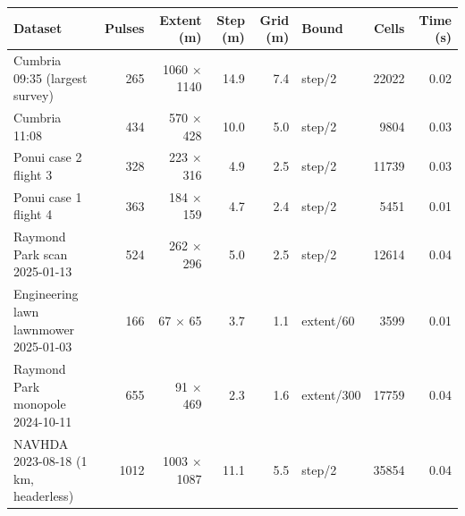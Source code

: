 \begin{tabular}{lrrrrlrr}
\toprule
Dataset & Pulses & Extent (m) & Step (m) & Grid (m) & Bound & Cells & Time (s) \\
\midrule
Cumbria 09:35 (largest survey) & 265 & 1060 $\times$ 1140 & 14.9 & 7.4 & step/2 & 22022 & 0.02 \\
Cumbria 11:08 & 434 & 570 $\times$ 428 & 10.0 & 5.0 & step/2 & 9804 & 0.03 \\
Ponui case 2 flight 3 & 328 & 223 $\times$ 316 & 4.9 & 2.5 & step/2 & 11739 & 0.03 \\
Ponui case 1 flight 4 & 363 & 184 $\times$ 159 & 4.7 & 2.4 & step/2 & 5451 & 0.01 \\
Raymond Park scan 2025-01-13 & 524 & 262 $\times$ 296 & 5.0 & 2.5 & step/2 & 12614 & 0.04 \\
Engineering lawn lawnmower 2025-01-03 & 166 & 67 $\times$ 65 & 3.7 & 1.1 & extent/60 & 3599 & 0.01 \\
Raymond Park monopole 2024-10-11 & 655 & 91 $\times$ 469 & 2.3 & 1.6 & extent/300 & 17759 & 0.04 \\
NAVHDA 2023-08-18 (1 km, headerless) & 1012 & 1003 $\times$ 1087 & 11.1 & 5.5 & step/2 & 35854 & 0.04 \\
\bottomrule
\end{tabular}
